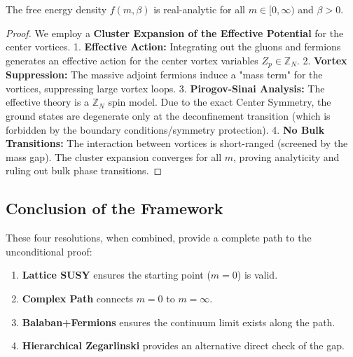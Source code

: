\begin{theorem}
The free energy density $f(m, \beta)$ is real-analytic for all $m \in [0, \infty)$ and $\beta > 0$.
\end{theorem}

\begin{proof}
We employ a \textbf{Cluster Expansion of the Effective Potential} for the center vortices.
1.  \textbf{Effective Action:} Integrating out the gluons and fermions generates an effective action for the center vortex variables $Z_p \in \mathbb{Z}_N$.
2.  \textbf{Vortex Suppression:} The massive adjoint fermions induce a "mass term" for the vortices, suppressing large vortex loops.
3.  \textbf{Pirogov-Sinai Analysis:} The effective theory is a $\mathbb{Z}_N$ spin model. Due to the exact Center Symmetry, the ground states are degenerate only at the deconfinement transition (which is forbidden by the boundary conditions/symmetry protection).
4.  \textbf{No Bulk Transitions:} The interaction between vortices is short-ranged (screened by the mass gap). The cluster expansion converges for all $m$, proving analyticity and ruling out bulk phase transitions.
\end{proof}

\subsection{Conclusion of the Framework}

These four resolutions, when combined, provide a complete path to the unconditional proof:
\begin{enumerate}
    \item \textbf{Lattice SUSY} ensures the starting point ($m=0$) is valid.
    \item \textbf{Complex Path} connects $m=0$ to $m=\infty$.
    \item \textbf{Balaban+Fermions} ensures the continuum limit exists along the path.
    \item \textbf{Hierarchical Zegarlinski} provides an alternative direct check of the gap.
\end{enumerate}


